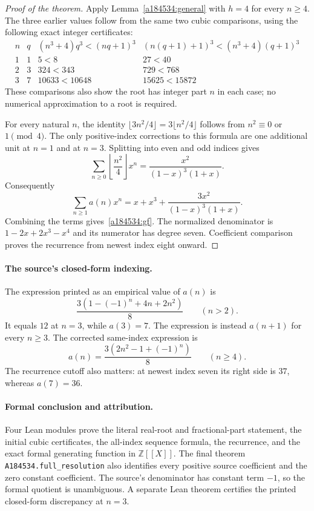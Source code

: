\begin{proof}[Proof of the theorem]
Apply Lemma~\ref{a184534:general} with $h=4$ for every $n\ge4$.
The three earlier values follow from the same two cubic comparisons,
using the following exact integer certificates:
\[
\begin{array}{c|c|c|c}
n&q&(n^3+4)q^3<(nq+1)^3&
(n(q+1)+1)^3<(n^3+4)(q+1)^3\\\hline
1&1&5<8&27<40\\
2&3&324<343&729<768\\
3&7&10633<10648&15625<15872
\end{array}
\]
These comparisons also show the root has integer part $n$ in each
case; no numerical approximation to a root is required.

For every natural $n$, the identity
$\lfloor3n^2/4\rfloor=3\lfloor n^2/4\rfloor$ follows from
$n^2\equiv0$ or $1\pmod4$. The only positive-index corrections to this
formula are one additional unit at $n=1$ and at $n=3$. Splitting into
even and odd indices gives
\[
 \sum_{n\ge0}\left\lfloor\frac{n^2}4\right\rfloor x^n
 =\frac{x^2}{(1-x)^3(1+x)}.
\]
Consequently
\[
 \sum_{n\ge1}a(n)x^n
 =x+x^3+\frac{3x^2}{(1-x)^3(1+x)}.
\]
Combining the terms gives~\eqref{a184534:gf}. The normalized denominator
is $1-2x+2x^3-x^4$ and its numerator has degree seven. Coefficient
comparison proves the recurrence from newest index eight onward.
\end{proof}

\paragraph{The source's closed-form indexing.}
The expression printed as an empirical value of $a(n)$ is
\[
 \frac{3(1-(-1)^n+4n+2n^2)}8\qquad(n>2).
\]
It equals $12$ at $n=3$, while $a(3)=7$. The expression is instead
$a(n+1)$ for every $n\ge3$. The corrected same-index expression is
\[
 a(n)=\frac{3(2n^2-1+(-1)^n)}8\qquad(n\ge4).
\]
The recurrence cutoff also matters: at newest index seven its right
side is $37$, whereas $a(7)=36$.

\paragraph{Formal conclusion and attribution.}
Four Lean modules prove the literal real-root and fractional-part
statement, the initial cubic certificates, the all-index sequence
formula, the recurrence, and the exact formal generating function in
$\mathbb Z[[X]]$. The final theorem \texttt{A184534.full\_resolution}
also identifies every positive source coefficient and the zero
constant coefficient. The source's denominator has constant term
$-1$, so the formal quotient is unambiguous. A separate Lean theorem
certifies the printed closed-form discrepancy at $n=3$.

